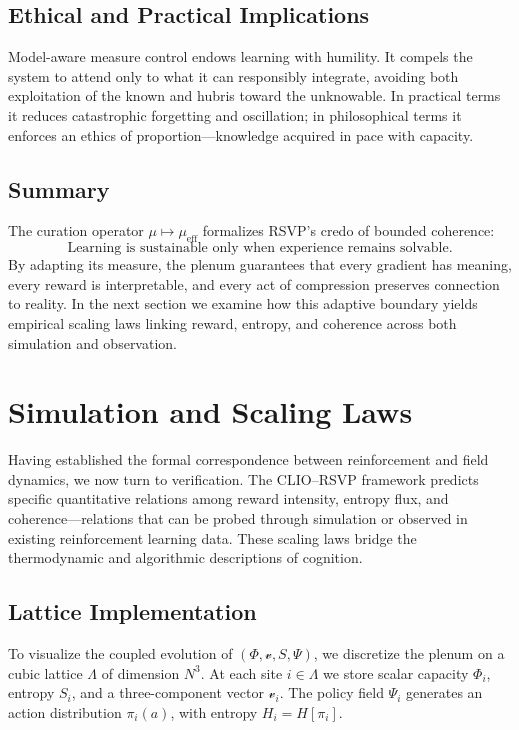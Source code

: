 \documentclass[11pt]{article}
\begin{document}
\subsection{Ethical and Practical Implications}

Model-aware measure control endows learning with humility.  
It compels the system to attend only to what it can responsibly integrate, avoiding both exploitation of the known and hubris toward the unknowable.  
In practical terms it reduces catastrophic forgetting and oscillation;  
in philosophical terms it enforces an ethics of proportion—knowledge acquired in pace with capacity.

\subsection{Summary}

The curation operator $\mu\!\mapsto\!\mu_{\mathrm{eff}}$ formalizes RSVP’s credo of bounded coherence:  
\[
\text{Learning is sustainable only when experience remains solvable.}
\]
By adapting its measure, the plenum guarantees that every gradient has meaning, every reward is interpretable, and every act of compression preserves connection to reality.  
In the next section we examine how this adaptive boundary yields empirical scaling laws linking reward, entropy, and coherence across both simulation and observation.

\section{Simulation and Scaling Laws}
Having established the formal correspondence between reinforcement and field dynamics, we now turn to verification.  
The CLIO–RSVP framework predicts specific quantitative relations among reward intensity, entropy flux, and coherence—relations that can be probed through simulation or observed in existing reinforcement learning data.  
These scaling laws bridge the thermodynamic and algorithmic descriptions of cognition.

\subsection{Lattice Implementation}

To visualize the coupled evolution of $(\Phi,\mathcal{v},S,\Psi)$, we discretize the plenum on a cubic lattice $\Lambda$ of dimension $N^3$.  
At each site $i\!\in\!\Lambda$ we store scalar capacity $\Phi_i$, entropy $S_i$, and a three-component vector $\mathcal{v}_i$.  
The policy field $\Psi_i$ generates an action distribution $\pi_i(a)$, with entropy $H_i = H[\pi_i]$.  
\end{document}
